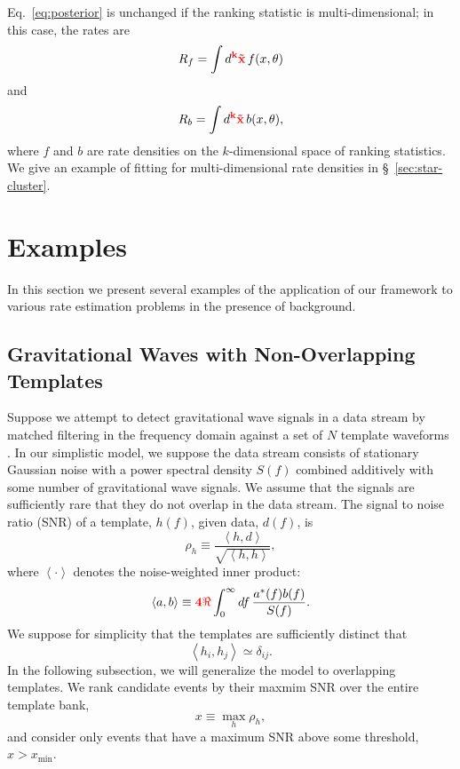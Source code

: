 \documentclass[aps,prd]{revtex4-1}
\newcommand{\xmin}{x_\mathrm{min}}
\newcommand{\ilya}[1]{{\color{red} \bf #1}}
\begin{document}
Eq.~\eqref{eq:posterior} is unchanged if the ranking statistic is
multi-dimensional; in this case, the rates are 
\begin{equation}
  R_f = \int d^\ilya{k} \ilya{\vec{x}} \, f(x, \theta)
\end{equation}
and
\begin{equation}
  R_b = \int d^\ilya{k} \ilya{\vec{x}} \, b(x, \theta),  
\end{equation}
where $f$ and $b$ are rate densities on the \ilya{$k$}-dimensional
space of ranking statistics.  We give an example of fitting for
multi-dimensional rate densities in \S~\ref{sec:star-cluster}.

\section{Examples}
\label{sec:GW-example}

In this section we present several examples of the application of our
framework to various rate estimation problems in the presence of
background.

\subsection{Gravitational Waves with Non-Overlapping Templates}
\label{sec:analytic-GW-example}

Suppose we attempt to detect gravitational wave signals in a data
stream by matched filtering in the frequency domain against a set of
$N$ template waveforms \citep[e.g.,][]{findchirppaper,LVC2011}.  In our simplistic
model, we suppose the data stream consists of stationary Gaussian
noise with a power spectral density $S(f)$ combined additively with
some number of gravitational wave signals.  We assume that the signals
are sufficiently rare that they do not overlap in the data stream.
The signal to noise ratio (SNR) of a template, $h(f)$, given data,
$d(f)$, is
\begin{equation}
  \rho_h \equiv \frac{\left\langle h, d \right\rangle}{\sqrt{\left
        \langle h, h \right\rangle}},
\end{equation}
where $\left \langle \cdot \right\rangle$ denotes the noise-weighted
inner product:
\begin{equation}
  \left\langle a, b \right\rangle \equiv \ilya{4 \Re} \int_0^\infty df\,
  \frac{a^*(f) b(f)}{S(f)}.
\end{equation}
We suppose for simplicity that the templates are sufficiently distinct
that 
\begin{equation}
  \left\langle h_i, h_j \right\rangle \simeq \delta_{ij}.
\end{equation}
In the following subsection, we will generalize the model to
overlapping templates.  We rank candidate events by their maxmim SNR
over the entire template bank,
\begin{equation}
  x \equiv \max_{h} \rho_h,
\end{equation}
and consider only events that have a maximum SNR above some threshold,
$x > \xmin$.
\end{document}
